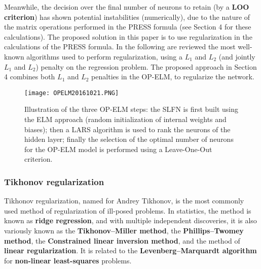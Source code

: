 Meanwhile, the decision over the final number of neurons to retain (by a \textbf{LOO criterion}) has shown potential instabilities (numerically), due to the nature of the matrix operations performed in the PRESS formula (see Section 4 for these calculations). The proposed solution in this paper is to use regularization in the calculations of the PRESS formula. In the following are reviewed the most well-known algorithms used to perform regularization, using a $L_1$ and $L_2$ (and jointly $L_1$ and $L_2$) penalty on the regression problem. The proposed approach in Section 4 combines both $L_1$ and $L_2$ penalties in the OP-ELM, to regularize the network.
\begin{figure}[t]
\begin{center}
\texttt{[image: OPELM20161021.PNG]}
\end{center}
\caption{Illustration of the three OP-ELM steps: the SLFN is first built using the ELM approach (random initialization of internal weights and biases); then a LARS algorithm is
used to rank the neurons of the hidden layer; finally the selection of the optimal number of neurons for the OP-ELM model is performed using a Leave-One-Out criterion.}
\label{OPELM20161021fig2}
\end{figure}
\subsubsection{Tikhonov regularization}
Tikhonov regularization, named for Andrey Tikhonov, is the most commonly used method of regularization of ill-posed problems. In statistics, the method is known as \textbf{ridge regression}, and with multiple independent discoveries, it is also variously known as the \textbf{Tikhonov–Miller method}, the \textbf{Phillips–Twomey method}, the \textbf{Constrained linear inversion method}, and the method of \textbf{linear regularization}. It is related to the \textbf{Levenberg–Marquardt algorithm} for \textbf{non-linear least-squares} problems.

